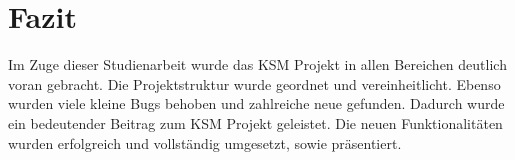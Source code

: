 \section{Fazit}

Im Zuge dieser Studienarbeit wurde das KSM Projekt in allen Bereichen deutlich voran gebracht. Die Projektstruktur wurde geordnet und vereinheitlicht. Ebenso wurden viele kleine Bugs behoben und zahlreiche neue gefunden. Dadurch wurde ein bedeutender Beitrag zum KSM Projekt geleistet. Die neuen Funktionalitäten wurden erfolgreich und vollständig umgesetzt, sowie präsentiert.

